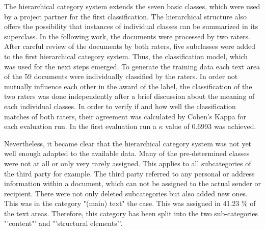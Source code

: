 \documentclass[11pt,a4paper]{article}
\begin{document}
The hierarchical category system extends the seven basic classes, which were used by a project partner for the first classification. The hierarchical structure also offers the possibility that instances of individual classes can be summarized in its superclass. In the following work, the documents were processed by two raters. After careful review of the documents by both raters, five subclasses were added to the first hierarchical category system. Thus, the classification model, which was used for the next steps emerged. To generate the training data each text area of the 59 documents were individually classified by the raters. In order not mutually influence each other in the award of the label, the classification of the two raters was done  independently after a brief discussion about the meaning of each individual classes. In order to verify if and how well the classification matches of both raters, their agreement was calculated by Cohen's Kappa for each evaluation run. In the first evaluation run a $\kappa$ value of 0.6993 was achieved.


Nevertheless, it became clear that the hierarchical category system was not yet well enough adapted to the available data. Many of the pre-determined classes were not at all or only very rarely assigned. This applies to all subcategories of the third party for example. The third party referred to any personal or address information within a document, which can not be assigned to the actual sender or recipient. There were not only deleted subcategories but also added new ones. This was in the category "(main) text" the case. This was assigned in 41.23 \% of the text areas. Therefore, this category has been split into the two  sub-categories "'content"' and "'structural elements"'.
\end{document}
